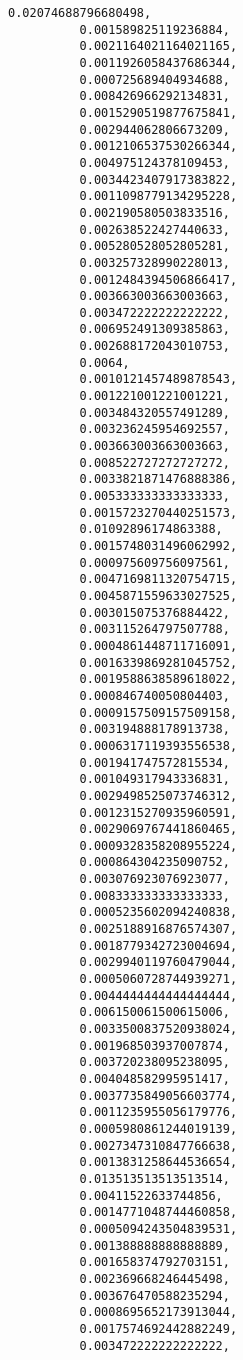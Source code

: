 \documentclass[11pt]{article}
\begin{document}
\begin{Verbatim}[commandchars=\\\{\}]
          0.02074688796680498,
          0.001589825119236884,
          0.0021164021164021165,
          0.0011926058437686344,
          0.000725689404934688,
          0.008426966292134831,
          0.0015290519877675841,
          0.002944062806673209,
          0.0012106537530266344,
          0.004975124378109453,
          0.0034423407917383822,
          0.0011098779134295228,
          0.002190580503833516,
          0.002638522427440633,
          0.005280528052805281,
          0.003257328990228013,
          0.0012484394506866417,
          0.003663003663003663,
          0.003472222222222222,
          0.006952491309385863,
          0.002688172043010753,
          0.0064,
          0.0010121457489878543,
          0.001221001221001221,
          0.003484320557491289,
          0.003236245954692557,
          0.003663003663003663,
          0.008522727272727272,
          0.0033821871476888386,
          0.005333333333333333,
          0.0015723270440251573,
          0.01092896174863388,
          0.0015748031496062992,
          0.000975609756097561,
          0.0047169811320754715,
          0.0045871559633027525,
          0.003015075376884422,
          0.003115264797507788,
          0.0004861448711716091,
          0.0016339869281045752,
          0.0019588638589618022,
          0.000846740050804403,
          0.0009157509157509158,
          0.003194888178913738,
          0.0006317119393556538,
          0.001941747572815534,
          0.001049317943336831,
          0.0029498525073746312,
          0.0012315270935960591,
          0.0029069767441860465,
          0.0009328358208955224,
          0.000864304235090752,
          0.003076923076923077,
          0.008333333333333333,
          0.0005235602094240838,
          0.0025188916876574307,
          0.0018779342723004694,
          0.0029940119760479044,
          0.0005060728744939271,
          0.0044444444444444444,
          0.006150061500615006,
          0.0033500837520938024,
          0.001968503937007874,
          0.003720238095238095,
          0.004048582995951417,
          0.0037735849056603774,
          0.0011235955056179776,
          0.0005980861244019139,
          0.0027347310847766638,
          0.0013831258644536654,
          0.013513513513513514,
          0.00411522633744856,
          0.0014771048744460858,
          0.0005094243504839531,
          0.001388888888888889,
          0.001658374792703151,
          0.002369668246445498,
          0.003676470588235294,
          0.0008695652173913044,
          0.0017574692442882249,
          0.003472222222222222,

\end{Verbatim}
\end{document}
